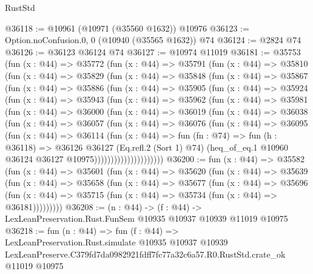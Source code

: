 \begin{lexlean}{RustStd}
\begin{coremodule}
@36118 := @10961 (@10971 (@35560 @1632)) @10976
@36123 := Option.noConfusion.{0, 0} (@10940 (@35565 @1632)) @74
@36124 := @2824 @74
@36126 := @36123 @36124 @74
@36127 := @10974 @11019
@36181 := @35753
    (fun (x : @44) =>
    @35772
      (fun (x : @44) =>
      @35791
        (fun (x : @44) =>
        @35810
          (fun (x : @44) =>
          @35829
            (fun (x : @44) =>
            @35848
              (fun (x : @44) =>
              @35867
                (fun (x : @44) =>
                @35886
                  (fun (x : @44) =>
                  @35905
                    (fun (x : @44) =>
                    @35924
                      (fun (x : @44) =>
                      @35943
                        (fun (x : @44) =>
                        @35962
                          (fun (x : @44) =>
                          @35981
                            (fun (x : @44) =>
                            @36000
                              (fun (x : @44) =>
                              @36019
                                (fun (x : @44) =>
                                @36038
                                  (fun (x : @44) =>
                                  @36057
                                    (fun (x : @44) =>
                                    @36076
                                      (fun (x : @44) =>
                                      @36095
                                        (fun (x : @44) =>
                                        @36114
                                          (fun (x : @44) =>
                                          fun (fn : @74) =>
                                          fun (h : @36118) =>
                                          @36126
                                            @36127
                                            (Eq.refl.{2} (Sort 1) @74)
                                            (heq_of_eq.{1}
                                              @10960
                                              @36124
                                              @36127
                                              @10975)))))))))))))))))))))
@36200 := fun (x : @44) =>
  @35582
    (fun (x : @44) =>
    @35601
      (fun (x : @44) =>
      @35620
        (fun (x : @44) =>
        @35639
          (fun (x : @44) =>
          @35658
            (fun (x : @44) =>
            @35677
              (fun (x : @44) =>
              @35696
                (fun (x : @44) => @35715 (fun (x : @44) => @35734 (fun (x : @44) => @36181)))))))))
@36208 := (n : @44) ->
  (f : @44) -> LexLeanPreservation.Rust.FunSem @10935 @10937 @10939 @11019 @10975
@36218 := fun (n : @44) =>
  fun (f : @44) =>
  LexLeanPreservation.Rust.simulate
    @10935
    @10937
    @10939
    LexLeanPreserve.C379fd7da0982921fdff7fc77a32c6a57.R0.RustStd.crate_ok
    @11019
    @10975
\end{coremodule}
\end{lexlean}
